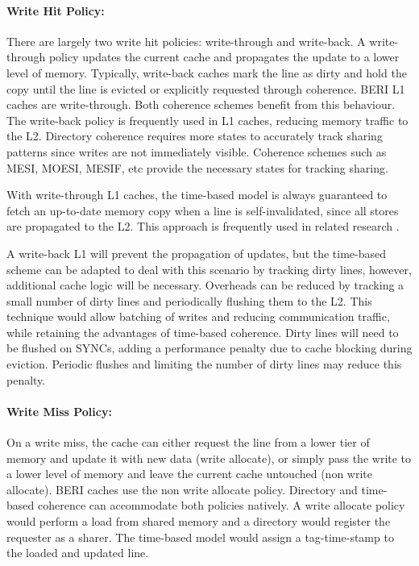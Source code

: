 	\paragraph{Write Hit Policy:} There are largely two write hit policies: write-through and write-back. A write-through policy updates the current cache and propagates the update to a lower level of memory. Typically, write-back caches mark the line as dirty and hold the copy until the line is evicted or explicitly requested through coherence. BERI L1 caches are write-through. Both coherence schemes benefit from this behaviour. The write-back policy is frequently used in L1 caches, reducing memory traffic to the L2. Directory coherence requires more states to accurately track sharing patterns since writes are not immediately visible. Coherence schemes such as MESI, MOESI, MESIF, etc provide the necessary states for tracking sharing. 
	
	With write-through L1 caches, the time-based model is always guaranteed to fetch an up-to-date memory copy when a line is self-invalidated, since all stores are propagated to the L2. This approach is frequently used in related research \cite{Chen92,Choi11,Singh13,Singh14,Sung15}. 
	
	A write-back L1 will prevent the propagation of updates, but the time-based scheme can be adapted to deal with this scenario by tracking dirty lines, however, additional cache logic will be necessary. Overheads can be reduced by tracking a small number of dirty lines and periodically flushing them to the L2. This technique would allow batching of writes and reducing communication traffic, while retaining the advantages of time-based coherence. Dirty lines will need to be flushed on SYNCs, adding a performance penalty due to cache blocking during eviction. Periodic flushes and limiting the number of dirty lines may reduce this penalty.
	
	\paragraph{Write Miss Policy:} On a write miss, the cache can either request the line from a lower tier of memory and update it with new data (write allocate), or simply pass the write to a lower level of memory and leave the current cache untouched (non write allocate). BERI caches use the non write allocate policy. Directory and time-based coherence can accommodate both policies natively. A write allocate policy would perform a load from shared memory and a directory would register the requester as a sharer. The time-based model would assign a tag-time-stamp to the loaded and updated line.

